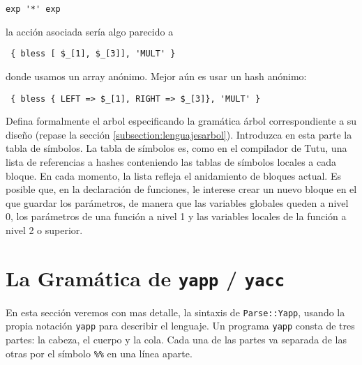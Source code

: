 \begin{enumerate}
\begin{center}
\verb|exp '*' exp|
\end{center}

la acción asociada sería algo parecido a 

\begin{center}
\verb| { bless [ $_[1], $_[3]], 'MULT' } |
\end{center}

donde usamos un array anónimo. Mejor aún es usar un hash anónimo:

\begin{center}
\verb| { bless { LEFT => $_[1], RIGHT => $_[3]}, 'MULT' } |
\end{center}

Defina formalmente el arbol especificando la gramática árbol correspondiente a su diseño
(repase la sección \ref{subsection:lenguajesarbol}).
Introduzca en esta parte la tabla de símbolos.
La tabla de símbolos es, como en el compilador de Tutu, una lista 
de referencias a hashes conteniendo las tablas de símbolos locales a 
cada bloque.  En cada momento, la lista refleja el anidamiento de bloques 
actual. Es posible que, en la declaración 
de funciones, le interese crear un nuevo bloque en el que guardar los parámetros,
de manera que las variables globales queden a nivel 0, los parámetros 
de una función a nivel 1 y las variables locales de la función a nivel 2
o superior.
\end{enumerate}




\section{La Gramática de {\tt yapp} / {\tt yacc}}
En esta sección veremos con mas detalle, la sintaxis de \verb|Parse::Yapp|,
usando la propia notación \verb|yapp| para describir el lenguaje.
Un programa \verb|yapp| consta de tres partes:
la cabeza, el cuerpo y la cola. Cada una de las partes
va separada de las otras por el símbolo \verb|%%| en una
línea aparte.

